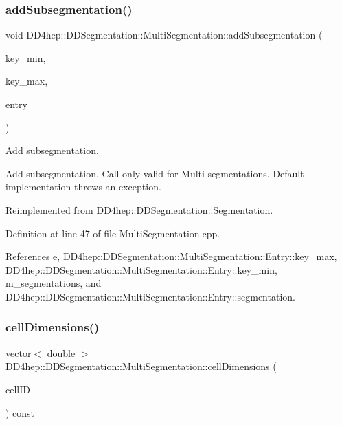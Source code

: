 \subsubsection{\texorpdfstring{add\+Subsegmentation()}{addSubsegmentation()}}
{\footnotesize\ttfamily void D\+D4hep\+::\+D\+D\+Segmentation\+::\+Multi\+Segmentation\+::add\+Subsegmentation (\begin{DoxyParamCaption}\item[{long}]{key\+\_\+min,  }\item[{long}]{key\+\_\+max,  }\item[{\hyperlink{class_d_d4hep_1_1_d_d_segmentation_1_1_segmentation}{Segmentation} $\ast$}]{entry }\end{DoxyParamCaption})\hspace{0.3cm}{\ttfamily [virtual]}}



Add subsegmentation. 

Add subsegmentation. Call only valid for Multi-\/segmentations. Default implementation throws an exception. 

Reimplemented from \hyperlink{class_d_d4hep_1_1_d_d_segmentation_1_1_segmentation_a881469fb51d55c2119e0a94672cb62da}{D\+D4hep\+::\+D\+D\+Segmentation\+::\+Segmentation}.



Definition at line 47 of file Multi\+Segmentation.\+cpp.



References e, D\+D4hep\+::\+D\+D\+Segmentation\+::\+Multi\+Segmentation\+::\+Entry\+::key\+\_\+max, D\+D4hep\+::\+D\+D\+Segmentation\+::\+Multi\+Segmentation\+::\+Entry\+::key\+\_\+min, m\+\_\+segmentations, and D\+D4hep\+::\+D\+D\+Segmentation\+::\+Multi\+Segmentation\+::\+Entry\+::segmentation.

\hypertarget{class_d_d4hep_1_1_d_d_segmentation_1_1_multi_segmentation_a2e0625412d4b05158509a3d1e45dc1e7}{}\label{class_d_d4hep_1_1_d_d_segmentation_1_1_multi_segmentation_a2e0625412d4b05158509a3d1e45dc1e7} 
\subsubsection{\texorpdfstring{cell\+Dimensions()}{cellDimensions()}}
{\footnotesize\ttfamily vector$<$ double $>$ D\+D4hep\+::\+D\+D\+Segmentation\+::\+Multi\+Segmentation\+::cell\+Dimensions (\begin{DoxyParamCaption}\item[{const \hyperlink{namespace_d_d4hep_1_1_d_d_segmentation_ac7af071d85cb48820914434a07e21ba1}{Cell\+ID} \&}]{cell\+ID }\end{DoxyParamCaption}) const\hspace{0.3cm}{\ttfamily [virtual]}}



